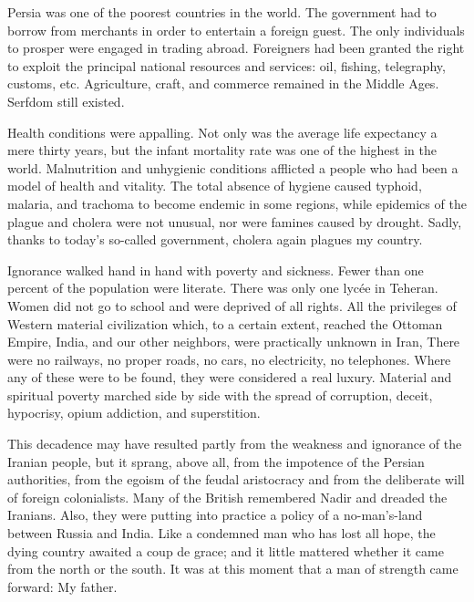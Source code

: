 Persia was one of the poorest countries in the world. The government had to borrow from merchants in order to entertain a foreign guest. The only individuals to prosper were engaged in trading abroad. Foreigners had been granted the right to exploit the principal national resources and services: oil, fishing, telegraphy, customs, etc. Agriculture, craft, and commerce remained in the Middle Ages. Serfdom still existed. 

Health conditions were appalling. Not only was the average life expectancy a mere thirty years, but the infant mortality rate was one of the highest in the world. Malnutrition and unhygienic conditions afflicted a people who had been a model of health and vitality. The total absence of hygiene caused typhoid, malaria, and trachoma to become endemic in some regions, while epidemics of the plague and cholera were not unusual, nor were famines caused by drought. Sadly, thanks to today's so-called government, cholera again plagues my country. 

Ignorance walked hand in hand with poverty and sickness. Fewer than one percent of the population were literate. There was only one lycée in Teheran. Women did not go to school and were deprived of all rights. All the privileges of Western material civilization which, to a certain extent, reached the Ottoman Empire, India, and our other neighbors, were practically unknown in Iran, There were no railways, no proper roads, no cars, no electricity, no telephones. Where any of these were to be found, they were considered a real luxury. Material and spiritual poverty marched side by side with the spread of corruption, deceit, hypocrisy, opium addiction, and superstition. 

This decadence may have resulted partly from the weakness and ignorance of the Iranian people, but it sprang, above all, from the impotence of the Persian authorities, from the egoism of the feudal aristocracy and from the deliberate will of foreign colonialists. Many of the British remembered Nadir and dreaded the Iranians. Also, they were putting into practice a policy of a no-man's-land between Russia and India. Like a condemned man who has lost all hope, the dying country awaited a coup de grace; and it little mattered whether it came from the north or the south. It was at this moment that a man of strength came forward: My father. 
